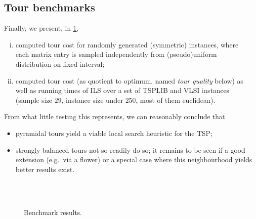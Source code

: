 \documentclass[index=totoc,bibliography=totoc]{scrartcl}
\numberwithin{equation}{section}
\numberwithin{figure}{section}
\numberwithin{table}{section}
\let\defstyle\itshape
\begin{document}
\subsection{Tour benchmarks}

Finally, we present, in \cref{fig:benchTSPLIB},%
\begin{enumerate}[(i)]
  \item
    computed tour cost for
    randomly generated (symmetric) instances,
    where each matrix entry is sampled independently from
    (pseudo)uniform distribution on fixed interval;
  \item computed tour cost (as quotient to optimum,
    named {\defstyle tour quality} below) as well as running times
    of ILS over a set of TSPLIB and VLSI instances
    (sample size $29$, instance size under $250$, most of them euclidean).
\end{enumerate}
From what little testing this represents, we can reasonably conclude that
\begin{itemize}
  \item pyramidal tours yield a viable local search heuristic for the TSP;
  \item strongly balanced tours not so readily do so;
    it remains to be seen if a good extension (e.g.\ via a flower)
    or a special case where this neighbourhood yields better results
    exist.
\end{itemize}

\begin{figure}[htbp]
\null\hfill%
\hfill\null\\
\null\hfill%
\hfill\null\\
\null\hfill%
\hfill\null
\caption{Benchmark results.}
\label{fig:benchTSPLIB}
\end{figure}

\end{document}
